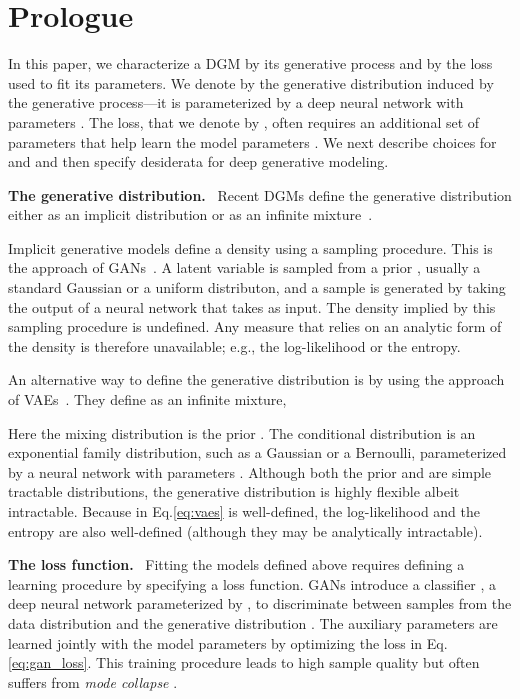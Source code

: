 \documentclass[11pt]{article}
\DeclareRobustCommand{\parhead}[1]{\textbf{#1}~}
\begin{document}
\section{Prologue}
\label{sec:background}

In this paper, we characterize a \gls{DGM} by its generative process and by the loss used to fit its parameters. We denote by  the generative distribution induced by the generative process---it is parameterized by a deep neural network with parameters . The loss, that we denote by , often requires an additional set of parameters  that help learn the model parameters . We next describe choices for  and  and then specify desiderata for deep generative modeling.

\parhead{The generative distribution.} 
Recent \glspl{DGM} define the generative distribution either as an implicit distribution or as an infinite mixture~\citep{goodfellow2014generative, kingma2013auto, rezende2014stochastic}. 

Implicit generative models define a density using a sampling procedure. This is the approach of \glspl{GAN}~\citep{goodfellow2014generative}. A latent variable  is sampled from a prior , usually a standard Gaussian or a uniform distributon, and a sample is generated by taking the output of a neural network that takes  as input. The density  implied by this sampling procedure is undefined. Any measure that relies on an analytic form of the density  is therefore unavailable; e.g., the log-likelihood or the entropy.

An alternative way to define the generative distribution is by using the approach of \glspl{VAE}~\citep{kingma2013auto, rezende2014stochastic}. They define  as an infinite mixture,

Here the mixing distribution is the prior . The conditional distribution  is an exponential family distribution, such as a Gaussian or a Bernoulli, parameterized by a neural network with parameters . Although both the prior  and  are simple tractable distributions, the generative distribution  is highly flexible albeit intractable. Because  in Eq.\nobreakspace \ref {eq:vaes} is well-defined, the log-likelihood and the entropy are also well-defined (although they may be analytically intractable). 

\parhead{The loss function.} 
Fitting the models defined above requires defining a learning procedure by specifying a loss function. \glspl{GAN} introduce a classifier , a deep neural network parameterized by , to discriminate between samples from the data distribution  and the generative distribution . The auxiliary parameters  are learned jointly with the model parameters  by optimizing the loss in Eq.\nobreakspace \ref {eq:gan_loss}. This training procedure leads to high sample quality but often suffers from \emph{mode collapse} \citep{arora2017generalization, arora2018gans}. 
\end{document}

